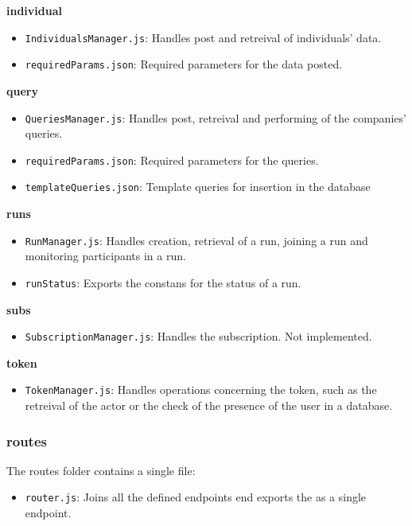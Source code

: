 \noindent \textbf{individual}
\begin{itemize}
    \item \texttt{IndividualsManager.js}: Handles post and retreival of individuals' data.
    \item \texttt{requiredParams.json}: Required parameters for the data posted.
\end{itemize}

\noindent \textbf{query}
\begin{itemize}
    \item \texttt{QueriesManager.js}: Handles post, retreival and performing of the companies' queries.
    \item \texttt{requiredParams.json}: Required parameters for the queries.
    \item \texttt{templateQueries.json}: Template queries for insertion in the database 
\end{itemize}

\noindent \textbf{runs}
\begin{itemize}
    \item \texttt{RunManager.js}: Handles creation, retrieval of a run, joining a run and monitoring participants in a run.
    \item \texttt{runStatus}: Exports the constans for the status of a run.
\end{itemize}

\noindent \textbf{subs}
\begin{itemize}
    \item \texttt{SubscriptionManager.js}: Handles the subscription. Not implemented.
\end{itemize}

\noindent \textbf{token}
\begin{itemize}
    \item \texttt{TokenManager.js}: Handles operations concerning the token, such as the retreival of the actor or the check of the presence of the user in a database.
\end{itemize}

\subsubsection{routes}
The routes folder contains a single file: 
\begin{itemize}
    \item \texttt{router.js}: Joins all the defined endpoints end exports the as a single endpoint.
\end{itemize}

